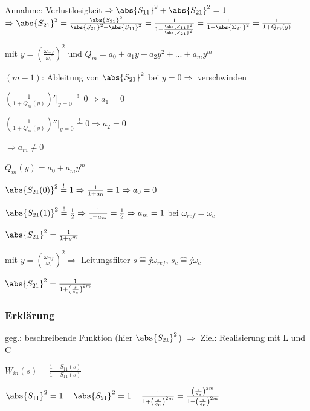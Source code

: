 Annahme: Verlustlosigkeit $\Rightarrow \abs{S_{11}}^2 + \abs{S_{21}}^2 = 1$
\\$\Rightarrow \abs{S_{21}}^2 = \frac{\abs{S_{21}}^2}{\abs{S_{21}}^2 +\abs{S_{11}}^2} = \frac{1}{1 + \frac{\abs{S_{11}}^2}{\abs{S_{21}}^2}} = \frac{1}{1 + \abs{\Sigma_{21}}^2} = \frac{1}{1 + Q_m(y)}$

mit $y = \left(\frac{\omega_{ref}}{\omega_c}\right)^2$ und $Q_m = a_0 + a_1y + a_2y^2 + ... + a_my^m$

$(m-1)$: Ableitung von $\abs{S_{21}}^2$ bei $y = 0 \Rightarrow$ verschwinden

\begin{pitemize}
    \item $\left(\frac{1}{1 + Q_m(y)}\right)' |_{y=0} \overset{!}{=} 0 \Rightarrow a_1 = 0$
    \item $\left(\frac{1}{1 + Q_m(y)}\right)'' |_{y=0} \overset{!}{=} 0 \Rightarrow a_2 = 0$
    \item $\Rightarrow a_m \ne 0$
\end{pitemize}

$Q_m(y) = a_0 + a_my^m$
\begin{penumerate}
    \item $\abs{S_{21}(0)}^2 \overset{!}{=} 1 \Rightarrow \frac{1}{1 + a_0} = 1 \Rightarrow a_0 = 0$
    \item $\abs{S_{21}(1)}^2 \overset{!}{=} \frac{1}{2} \Rightarrow \frac{1}{1 + a_m} = \frac{1}{2} \Rightarrow a_m = 1$ bei $\omega_{ref} = \omega_c$
\end{penumerate}

$\abs{S_{21}}^2 = \frac{1}{1 + y^m}$

mit $y = \left(\frac{\omega_{ref}}{\omega_c}\right)^2 \Rightarrow$ Leitungsfilter $s \hat{=} j\omega_{ref}$, $s_c \hat{=} j\omega_{c}$

$\abs{S_{21}}^2 = \frac{1}{1 + \left(\frac{s}{s_c}\right)^{2m}}$

\subsubsection{Erklärung}
geg.: beschreibende Funktion (hier $\abs{S_{21}}^2$) $\Rightarrow$ Ziel: Realisierung mit L und C



$W_{in}(s) = \frac{1 - S_{11}(s)}{1 + S_{11}(s)}$

$\abs{S_{11}}^2 = 1 - \abs{S_{21}}^2 = 1 - \frac{1}{1 + \left(\frac{s}{s_c}\right)^{2m}} = \frac{\left(\frac{s}{s_c}\right)^{2m}}{1 + \left(\frac{s}{s_c}\right)^{2m}}$

